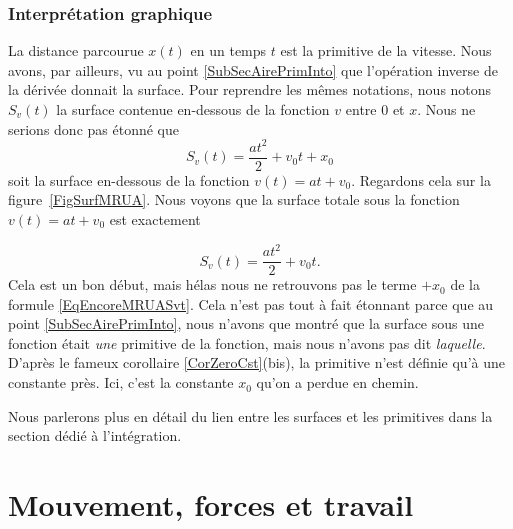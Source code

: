\documentclass[a4paper,12pt]{book}
\theoremstyle{mes_exemples}	\newtheorem{exemple}[numtho]{Exemple}
\theoremstyle{mes_tho}
\begin{document}
					\subsection{Interprétation graphique}

La distance parcourue $x(t)$ en un temps $t$ est la primitive de la vitesse. Nous avons, par ailleurs, vu au point \ref{SubSecAirePrimInto} que l'opération inverse de la dérivée donnait la surface. Pour reprendre les mêmes notations, nous notons $S_v(t)$ la surface contenue en-dessous de la fonction $v$ entre $0$ et $x$. Nous ne serions donc pas étonné que
\begin{equation}		\label{EqEncoreMRUASvt}
	S_v(t) = \frac{ at^2 }{ 2 }+v_0t+x_0
\end{equation}
soit la surface en-dessous de la fonction $v(t)=at+v_0$. Regardons cela sur la figure~\ref{FigSurfMRUA}. Nous voyons que la surface totale sous la fonction $v(t)=at+v_0$ est exactement
\newcommand{\CaptionSurfMRUA}{La surface bleue est un triangle de base $t$ et de hauteur $at$, tandis que le rectangle rouge est de base $t$ et de hauteur $v_0$.}

\begin{equation}
	S_v(t)=\frac{ at^2 }{ 2 }+v_0t.
\end{equation}
Cela est un bon début, mais hélas nous ne retrouvons pas le terme \og $+x_0$\fg{} de la formule \eqref{EqEncoreMRUASvt}. Cela n'est pas tout à fait étonnant parce que au point \ref{SubSecAirePrimInto}, nous n'avons que montré que la surface sous une fonction était \emph{une} primitive de la fonction, mais nous n'avons pas dit \emph{laquelle}. D'après le fameux corollaire \ref{CorZeroCst}(bis), la primitive n'est définie qu'à une constante près. Ici, c'est la constante $x_0$ qu'on a perdue en chemin.

Nous parlerons plus en détail du lien entre les surfaces et les primitives dans la section dédié à l'intégration.


\label{LaFin}

\chapter{Mouvement, forces et travail}
\end{document}
